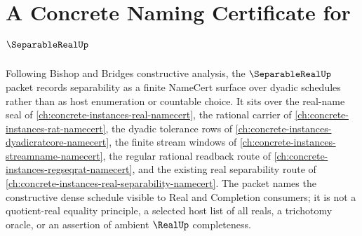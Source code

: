 \chapter{A Concrete Naming Certificate for $\SeparableRealUp$}
\label{ch:concrete-instances-separable-real-namecert}

Following Bishop and Bridges constructive analysis, the $\SeparableRealUp$ packet records separability as a finite NameCert surface over dyadic schedules rather than as host enumeration or countable choice. It sits over the real-name seal of \autoref{ch:concrete-instances-real-namecert}, the rational carrier of \autoref{ch:concrete-instances-rat-namecert}, the dyadic tolerance rows of \autoref{ch:concrete-instances-dyadicratcore-namecert}, the finite stream windows of \autoref{ch:concrete-instances-streamname-namecert}, the regular rational readback route of \autoref{ch:concrete-instances-regseqrat-namecert}, and the existing real separability route of \autoref{ch:concrete-instances-real-separability-namecert}. The packet names the constructive dense schedule visible to Real and Completion consumers; it is not a quotient-real equality principle, a selected host list of all reals, a trichotomy oracle, or an assertion of ambient $\RealUp$ completeness.

